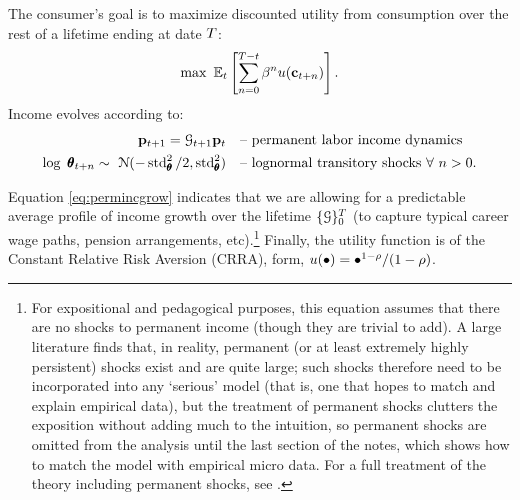 The consumer's goal is to maximize discounted utility from consumption over the rest of a lifetime ending at date $T$:
  \begin{equation}\label{eq:MaxProb}
    \max~\operatorname{\mathbb{E}}_{t}\left[\sum_{n=0}^{T-t}\beta^{n} u({\mathbf{c}}_{t+n})\right].
  \end{equation}
Income evolves according to:
  \begin{equation}\begin{gathered}\begin{aligned}
        \mathbf{p}_{t+1}   = \mathcal{G}_{t+1}\mathbf{p}_{t}                                        & \text{~~ -- permanent labor income dynamics} \label{eq:permincgrow}
        \\ \log ~ \pmb{\theta}_{t+n}  \sim ~\mathcal{N}(-\operatorname{std}_{\pmb{\theta}}^{2}/2,\operatorname{std}_{\pmb{\theta}}^{2}) & \text{~~ -- lognormal transitory shocks}~\forall~n>0 .
      \end{aligned}\end{gathered}\end{equation}

Equation \eqref{eq:permincgrow} indicates that we are allowing for a predictable average profile of income growth over the lifetime $\{\mathcal{G}\}_{0}^{T}$ (to capture typical career wage paths, pension arrangements, etc).\footnote{For expositional and pedagogical purposes, this equation assumes that there are no shocks to permanent income (though they are trivial to add).  A large literature finds that, in reality, permanent (or at least extremely highly persistent) shocks exist and are quite large; such shocks therefore need to be incorporated into any `serious' model (that is, one that hopes to match and explain empirical data), but the treatment of permanent shocks clutters the exposition without adding much to the intuition, so permanent shocks are omitted from the analysis until the last section of the notes, which shows how to match the model with empirical micro data.  For a full treatment of the theory including permanent shocks, see \cite{BufferStockTheory}.}  Finally, the utility function is of the Constant Relative Risk Aversion (CRRA), form, $u(\bullet) = \bullet^{1-\rho}/(1-\rho)$.

